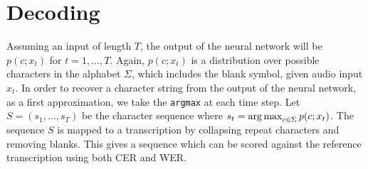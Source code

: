 \section{Decoding}
\label{sec:first_pass:decoding}


Assuming an input of length $T$, the output of the neural network will be $p(c;
x_t)$ for $t = 1,\ldots,T$. Again, $p(c; x_t)$ is a distribution over possible
characters in the alphabet $\Sigma$, which includes the blank symbol, given
audio input $x_t$. In order to recover a character string from the output of
the neural network, as a first approximation, we take the \texttt{argmax} at
each time step. Let $S = (s_1,\ldots,s_T)$ be the character sequence where $s_t
= \operatorname*{arg\,max}_{c \in \Sigma} p(c; x_t)$. The sequence $S$ is mapped to a
transcription by collapsing repeat characters and removing blanks. This gives a
sequence which can be scored against the reference transcription using both CER
and WER.

